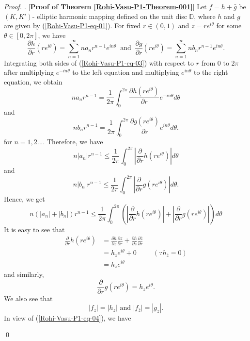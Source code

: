 \documentclass[a4paper,12pt]{amsart}
\theoremstyle{plain}
\theoremstyle{definition}
\newenvironment{pf}[1][]{%
	\vskip 3mm
	\noindent
	\ifthenelse{\equal{#1}{}}%
	{{\slshape Proof. }}%
	{{\slshape #1.} }%
}%
{\qed\bigskip}
\begin{document}
\begin{pf} [{\bf Proof of Theorem   \ref{Rohi-Vasu-P1-Theorem-001}}]
Let $f=h+\bar{g}$ be $(K,K')$- elliptic harmonic mapping defined on the unit disc $\mathbb{D}$, where $h$ and $g$ are given by (\ref{Rohi-Vasu-P1-eq-01}). For fixed $r \in (0,1)$ and $z=r e^{i\theta}$ for some $\theta \in [0,2\pi]$, we have 
\begin{equation}\label{Rohi-Vasu-P1-eq-03}
\frac{\partial h}{\partial r}(r e^{i \theta})=\sum_{n=1}^{\infty} n a_n r^{n-1} e^{i n \theta} \ 
\text { and } \ \frac{\partial g}{\partial r}(r e^{i \theta})=\sum_{n=1}^{\infty} n b_n r^{n-1} e^{i n \theta}.
\end{equation}
Integrating both sides of (\ref{Rohi-Vasu-P1-eq-03}) with respect to $r$ from $ 0$ to $2\pi $ after multiplying $e^{-i n \theta}$ to the left equation and multiplying $e^{i n \theta}$ to the right equation, we obtain
$$
n a_n r^{n-1}=\frac{1}{2 \pi} \int_0^{2 \pi} \frac{\partial h( re^{i \theta}) }{\partial r} e^{-i n \theta} d \theta $$
and 
$$
n b_n r^{n-1}=\frac{1}{2 \pi} \int_0^{2 \pi} \frac{\partial g( re^{i \theta}) }{\partial r} e^{i n \theta} d \theta.  $$ 
for $n=1,2...$.
Therefore, we have
$$
 n\left|a_n\right| r^{n-1} \leq \frac{1}{2 \pi} \int_0^{2 \pi} \left| {\frac{\partial}{\partial r}}h(re^{i \theta}) \right|  d \theta  $$
 and 
 $$
  n\left|b_n\right| r^{n-1} \leq \frac{1}{2 \pi} \int_0^{2 \pi} \left| {\frac{\partial }{\partial r}}g(re^{i \theta}) \right|  d \theta.$$
  Hence, we get
  $$
 n\left(\left|a_n\right|+\left|b_n\right|\right) r^{n-1} \leq \frac{1}{2 \pi} \int_0^{2 \pi}\left(\left|\frac{\partial }{\partial r}h(re^{i \theta})\right|+\left|\frac{\partial}{\partial r} g(re^{i \theta})\right|\right) d \theta 
$$
It is easy to see that
$$
\begin{aligned}
\frac{\partial }{\partial r}h( re^{i \theta}) &=\frac{\partial h}{\partial z} \frac{\partial z}{\partial r}+\frac{\partial h}{\partial \bar{z}} \frac{\partial \bar{z}}{\partial r} \\
&=h_z e^{i \theta}+0 \quad \quad \ \  \left(\because h_{\bar{z}}=0\right)\\
&=h_z e^{i \theta}
\end{aligned}
$$
and similarly, $$
\frac{\partial}{\partial r} g( re^{i \theta})=h_z e^{i \theta}.
$$
We also see that
\begin{equation}\label{Rohi-Vasu-P1-eq-04}
\left|f_z\right|=\left|h_z\right| \text { and }\left|f_{\bar{z}}\right|=\left|g_z\right|.
\end{equation}
In view of (\ref{Rohi-Vasu-P1-eq-04}), we have


\end{pf}
\end{document}
